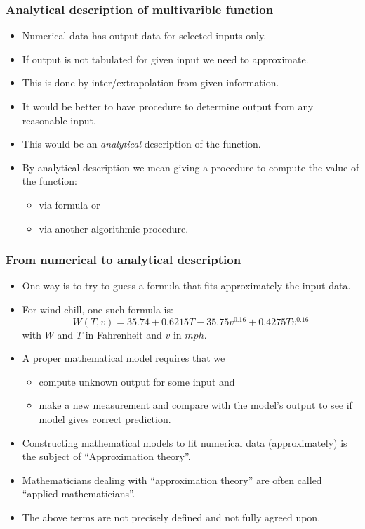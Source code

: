 \begin{frame}\frametitle{Analytical description of multivarible function}

\begin{itemize}
\item Numerical data has output data for selected inputs only. 
\item<2-> If output is not tabulated for given input we need to approximate.
\item<3-> This is done by inter/extrapolation from given information. 
\item<4-> It would be better to have procedure to determine output from any reasonable input. 
\item<5-> This would be an \emph{analytical} description of the function. 
\item<5-> By analytical description we mean giving a procedure to compute the value of the function:
\begin{itemize}
\item<6-> via formula or
\item<7-> via another algorithmic procedure.
\end{itemize}

\end{itemize}
\end{frame}
\begin{frame}\frametitle{From numerical to analytical description}

\begin{itemize}
\item<1-> One way is to try to guess a formula that fits approximately the input data. 
\item<2-> For wind chill, one such formula is:
\[
W(T,v)= 35.74+0.6215 T - 35.75 v^{0.16} +0.4275 Tv^{0.16}
\]
with $W$ and $T$ in Fahrenheit and $v$ in $mph$.
\item<3-> A proper mathematical model requires that we
\begin{itemize}
\item<4-> compute unknown output for some input and 
\item<5-> make a new measurement and compare with the model's output to see if model gives correct prediction.
\end{itemize}
\item<6-> Constructing mathematical models to fit numerical data (approximately) is the subject of ``\alert<8>{Approximation theory}''. 
\item<7-> Mathematicians dealing with ``\alert<8>{approximation theory}'' are often called ``applied mathematicians''.
\item<8-> The \alert<8>{above terms} are not precisely defined and not fully agreed upon. 
\end{itemize}
\end{frame}
